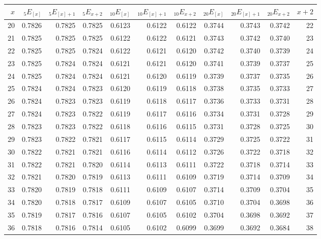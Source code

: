 \documentclass[12pt]{article}
\begin{document}
\begin{longtable}{rrrrrrrrrrr}
  \hline
$x$ & ${}_{5}E_{[x]}$ & ${}_{5}E_{[x]+1}$ & ${}_{5}E_{x+2}$ & ${}_{10}E_{[x]}$ & ${}_{10}E_{[x]+1}$ & ${}_{10}E_{x+2}$ & ${}_{20}E_{[x]}$ & ${}_{20}E_{[x]+1}$ & ${}_{20}E_{x+2}$ & $x+2$ \\ 
  \hline \endhead 20 & 0.7826 & 0.7825 & 0.7825 & 0.6123 & 0.6122 & 0.6122 & 0.3744 & 0.3743 & 0.3742 & 22 \\ 
  21 & 0.7825 & 0.7825 & 0.7825 & 0.6122 & 0.6122 & 0.6121 & 0.3743 & 0.3742 & 0.3740 & 23 \\ 
  22 & 0.7825 & 0.7825 & 0.7824 & 0.6122 & 0.6121 & 0.6120 & 0.3742 & 0.3740 & 0.3739 & 24 \\ 
  23 & 0.7825 & 0.7824 & 0.7824 & 0.6121 & 0.6121 & 0.6120 & 0.3741 & 0.3739 & 0.3737 & 25 \\ 
  24 & 0.7825 & 0.7824 & 0.7824 & 0.6121 & 0.6120 & 0.6119 & 0.3739 & 0.3737 & 0.3735 & 26 \\ 
  25 & 0.7824 & 0.7824 & 0.7823 & 0.6120 & 0.6119 & 0.6118 & 0.3738 & 0.3735 & 0.3733 & 27 \\ 
  26 & 0.7824 & 0.7823 & 0.7823 & 0.6119 & 0.6118 & 0.6117 & 0.3736 & 0.3733 & 0.3731 & 28 \\ 
  27 & 0.7824 & 0.7823 & 0.7822 & 0.6119 & 0.6117 & 0.6116 & 0.3734 & 0.3731 & 0.3728 & 29 \\ 
  28 & 0.7823 & 0.7823 & 0.7822 & 0.6118 & 0.6116 & 0.6115 & 0.3731 & 0.3728 & 0.3725 & 30 \\ 
  29 & 0.7823 & 0.7822 & 0.7821 & 0.6117 & 0.6115 & 0.6114 & 0.3729 & 0.3725 & 0.3722 & 31 \\ 
  30 & 0.7822 & 0.7821 & 0.7821 & 0.6116 & 0.6114 & 0.6112 & 0.3726 & 0.3722 & 0.3718 & 32 \\ 
  31 & 0.7822 & 0.7821 & 0.7820 & 0.6114 & 0.6113 & 0.6111 & 0.3722 & 0.3718 & 0.3714 & 33 \\ 
  32 & 0.7821 & 0.7820 & 0.7819 & 0.6113 & 0.6111 & 0.6109 & 0.3719 & 0.3714 & 0.3709 & 34 \\ 
  33 & 0.7820 & 0.7819 & 0.7818 & 0.6111 & 0.6109 & 0.6107 & 0.3714 & 0.3709 & 0.3704 & 35 \\ 
  34 & 0.7820 & 0.7818 & 0.7817 & 0.6109 & 0.6107 & 0.6105 & 0.3710 & 0.3704 & 0.3698 & 36 \\ 
  35 & 0.7819 & 0.7817 & 0.7816 & 0.6107 & 0.6105 & 0.6102 & 0.3704 & 0.3698 & 0.3692 & 37 \\ 
  36 & 0.7818 & 0.7816 & 0.7814 & 0.6105 & 0.6102 & 0.6099 & 0.3699 & 0.3692 & 0.3684 & 38 \\ 

\end{longtable}
\end{document}

